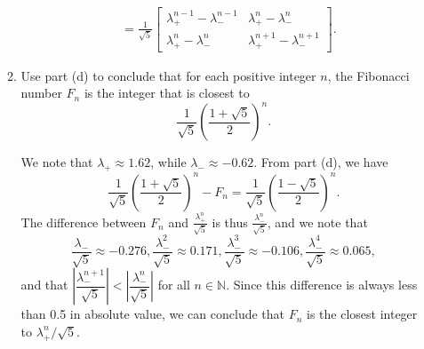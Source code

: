 \documentclass[letterpaper,12pt]{article}
\begin{document}
\begin{enumerate}
\begin{enumerate}
\begin{align*}
& = \frac{1}{\sqrt{5}}\begin{bmatrix}\lambda_+^{n-1}-\lambda_-^{n-1}&\lambda_+^n-\lambda_-^n\\
                       \lambda_+^n-\lambda_-^n&\lambda_+^{n+1}-\lambda_-^{n+1}
                      \end{bmatrix}.
\end{align*}

\bigskip

 \item Use part (d) to conclude that for each positive integer $n$, the Fibonacci number $F_n$ is the integer that is closest to 
 \[
 \frac{1}{\sqrt{5}}\left(\frac{1+\sqrt{5}}{2}\right)^n.
 \]

\bigskip

We note that $\lambda_+\approx 1.62$, while $\lambda_- \approx -0.62$. From part (d), we have
\[
 \frac{1}{\sqrt{5}}\left(\frac{1+\sqrt{5}}{2}\right)^n - F_n= \frac{1}{\sqrt{5}}\left(\frac{1-\sqrt{5}}{2}\right)^n.
\]
The difference between $F_n$ and $\frac{\lambda_+^n}{\sqrt{5}}$ is thus $\frac{\lambda_-^n}{\sqrt{5}}$, and we note that
\[
 \frac{\lambda_-}{\sqrt{5}}\approx -0.276, \frac{\lambda_-^2}{\sqrt{5}}\approx 0.171, \frac{\lambda_-^3}{\sqrt{5}}\approx -0.106, \frac{\lambda_-^4}{\sqrt{5}}\approx 0.065,
\]
and that $\left|\dfrac{\lambda_-^{n+1}}{\sqrt{5}}\right|<\left|\dfrac{\lambda_-^n}{\sqrt{5}}\right|$ for all $n\in\mathbb{N}$. Since this difference is always less than 0.5 in absolute value, we can conclude that $F_n$ is the closest integer to $\lambda_+^n/\sqrt{5}$.

 \end{enumerate}
 \end{enumerate}
\end{document}
